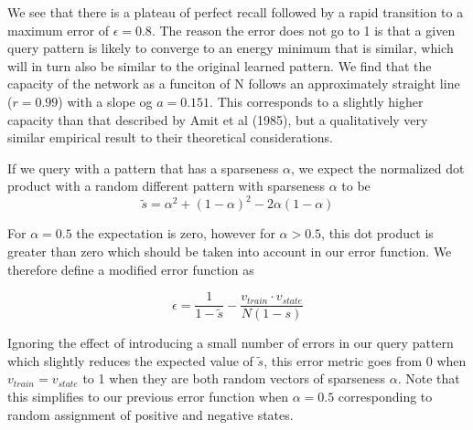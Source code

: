 \documentclass{article}
\begin{document}
We see that there is a plateau of perfect recall followed by a rapid transition to a maximum error of $\epsilon = 0.8$. The reason the error does not go to 1 is that a given query pattern is likely to converge to an energy minimum that is similar, which will in turn also be similar to the original learned pattern. We find that the capacity of the network as a funciton of N follows an approximately straight line ($r=0.99$) with a slope og $a=0.151$. This corresponds to a slightly higher capacity than that described by Amit et al (1985), but a qualitatively very similar empirical result to their theoretical considerations.

If we query with a pattern that has a sparseness $\alpha$, we expect the normalized dot product with a random different pattern with sparseness $\alpha$ to be
\begin{equation}
\tilde s = \alpha^2+(1-\alpha)^2-2\alpha(1-\alpha)
\end{equation}

For $\alpha=0.5$ the expectation is zero, however for $\alpha>0.5$, this dot product is greater than zero which should be taken into account in our error function. We therefore define a modified error function as 

\begin{equation}
\epsilon = \dfrac{1}{1-\tilde s} - \dfrac{v_{train}\cdot v_{state}}{N(1-s)}
\end{equation}

Ignoring the effect of introducing a small number of errors in our query pattern which slightly reduces the expected value of $\tilde s$, this error metric goes from 0 when $v_{train} = v_{state}$ to 1 when they are both random vectors of sparseness $\alpha$. Note that this simplifies to our previous error function when $\alpha=0.5$ corresponding to random assignment of positive and negative states.
\end{document}
